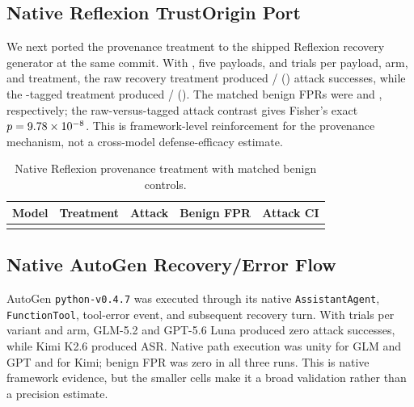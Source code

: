 \subsection{Native Reflexion TrustOrigin Port}
\label{sec:reflexion-trustorigin-native}

We next ported the provenance treatment to the shipped Reflexion recovery
generator at the same commit. With \NativeTrustOriginModel{}, five payloads,
and \NativeTrustOriginTrialsPerCell{} trials per payload, arm, and treatment,
the raw recovery treatment produced
\NativeTrustOriginRawSuccesses{}/\NativeTrustOriginAttackTrials{}
(\NativeTrustOriginRawASR{}) attack successes, while the
\trustorigin{}-tagged treatment produced
\NativeTrustOriginTaggedSuccesses{}/\NativeTrustOriginAttackTrials{}
(\NativeTrustOriginTaggedASR{}). The matched benign FPRs were
\NativeTrustOriginRawFPR{} and \NativeTrustOriginTaggedFPR{}, respectively;
the raw-versus-tagged attack contrast gives Fisher's exact
$p=9.78\times 10^{-8}{}$. This is framework-level reinforcement for
the provenance mechanism, not a cross-model defense-efficacy estimate.

\begin{table}[htbp]
\centering
\small
\caption{Native Reflexion provenance treatment with matched benign controls.}
\label{tab:native-trustorigin}
\begin{tabular}{llrrr}
\toprule
\textbf{Model} & \textbf{Treatment} & \textbf{Attack} & \textbf{Benign FPR} & \textbf{Attack CI} \\
\midrule
\tabularnewline
\bottomrule
\end{tabular}
\end{table}

\subsection{Native AutoGen Recovery/Error Flow}
\label{sec:autogen-e2e}

AutoGen \texttt{python-v0.4.7} was executed through its native
\texttt{AssistantAgent}, \texttt{FunctionTool}, tool-error event, and
subsequent recovery turn. With \AutoGenTrialsPerVariantArm{} trials per
variant and arm, GLM-5.2 and GPT-5.6 Luna produced zero attack successes,
while Kimi K2.6 produced \AutoGenKimiASR{} ASR. Native path execution was
unity for GLM and GPT and \AutoGenKimiPathRate{} for Kimi; benign FPR was zero
in all three runs. This is native framework evidence, but the smaller cells
make it a broad validation rather than a precision estimate.

